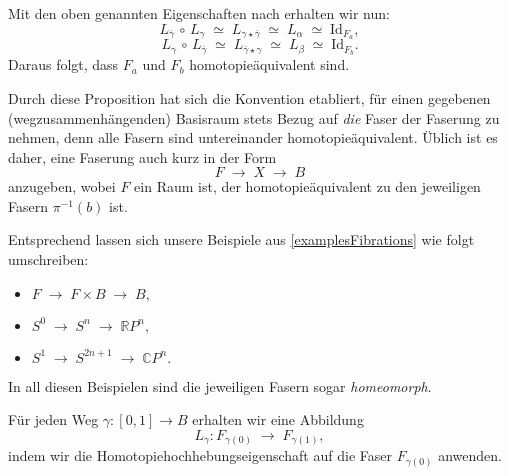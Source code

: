 \documentclass[12pt, hidelinks]{article}
\numberwithin{conj}{section}
\begin{document}
                \smallskip
                
                Mit den oben genannten Eigenschaften nach \cite[Prop.~4.61]{hatcher2001} erhalten wir nun:
                \[
                    L_{\overline{\gamma}} \,\circ\, L_\gamma
                    \;\simeq\;
                    L_{\gamma \star \overline{\gamma}}
                    \;\simeq\;
                    L_\alpha
                    \;\simeq\;
                    \mathrm{Id}_{F_a},
                \]
                \[
                    L_{\gamma} \,\circ\, L_{\overline{\gamma}}
                    \;\simeq\;
                    L_{\overline{\gamma} \star \gamma}
                    \;\simeq\;
                    L_\beta
                    \;\simeq\;
                    \mathrm{Id}_{F_b}.
                \]
                Daraus folgt, dass \(F_a\) und \(F_b\) homotopieäquivalent sind.
                
                \smallskip
                
                Durch diese Proposition hat sich die Konvention etabliert, für einen gegebenen (wegzusammenhängenden) Basisraum stets Bezug auf \emph{die} Faser der Faserung zu nehmen, denn alle Fasern sind untereinander homotopieäquivalent. Üblich ist es daher, eine Faserung auch kurz in der Form
                \[
                    F \;\longrightarrow\; X \;\longrightarrow\; B
                \]
                anzugeben, wobei \(F\) ein Raum ist, der homotopieäquivalent zu den jeweiligen Fasern \(\pi^{-1}(b)\) ist.
                
                \smallskip
                
                Entsprechend lassen sich unsere Beispiele aus \autoref{examplesFibrations} wie folgt umschreiben:
                \begin{itemize}[nolistsep]
                    \item \(F \;\longrightarrow\; F \times B \;\longrightarrow\; B,\)
                    \item \(S^0 \;\longrightarrow\; S^n \;\longrightarrow\; \mathbb{R}P^n,\)
                    \item \(S^1 \;\longrightarrow\; S^{2n+1} \;\longrightarrow\; \mathbb{C}P^n.\)
                \end{itemize}
                In all diesen Beispielen sind die jeweiligen Fasern sogar \emph{homeomorph}. 
                
                \noindent
                Für jeden Weg \(\gamma : [0,1] \to B\) erhalten wir eine Abbildung 
                \[
                    L_\gamma : F_{\gamma(0)} \;\longrightarrow\; F_{\gamma(1)},
                \]
                indem wir die Homotopiehochhebungseigenschaft auf die Faser \(F_{\gamma(0)}\) anwenden.
                
\end{document}
